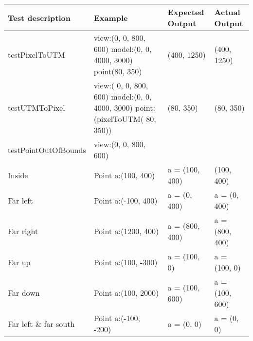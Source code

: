 \begin{centering}
\begin{longtable}{|p{}|p{}|p{}|p{}|}
\hline
Test description & Example & Expected Output & Actual Output\\
\hline
\hline
testPixelToUTM & view:(0, 0, 800, 600) model:(0, 0, 4000, 3000) point(80, 350) &
(400, 1250) & (400, 1250)\\
\hline
\hline
testUTMToPixel & view:( 0, 0, 800, 600) model:(0, 0, 4000, 3000)
point:(pixelToUTM( 80, 350)) & (80, 350) & (80, 350)\\
\hline
\hline
testPointOutOfBounds & view:(0, 0, 800, 600) & & \\
\hline
Inside & Point a:(100, 400) & a = (100, 400) & (100, 400)\\
\hline
Far left & Point a:(-100, 400) & a = (0, 400) & a = (0, 400)\\
\hline
Far right & Point a:(1200, 400) & a = (800, 400) & a = (800, 400)\\
\hline
Far up & Point a:(100, -300) & a = (100, 0) & a = (100, 0)\\
\hline
Far down & Point a:(100, 2000) & a = (100, 600) & a = (100, 600)\\
\hline
Far left \& far south & Point a:(-100, -200) & a = (0, 0) & a = (0, 0)\\
\hline
\end{longtable}
\end{centering}